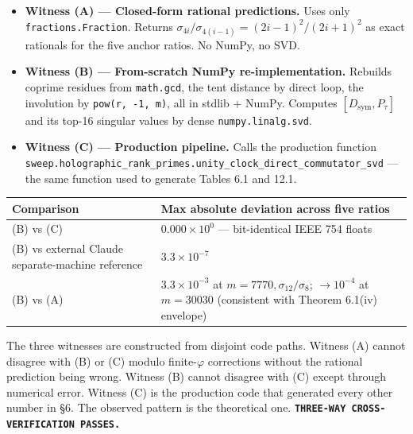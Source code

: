 \documentclass[
  11pt,
]{article}
\newcounter{none} %
\providecommand{\tightlist}{%
  \setlength{\itemsep}{0pt}\setlength{\parskip}{0pt}}
\begin{document}
\begin{itemize}
\tightlist
\item
  \textbf{Witness (A) --- Closed-form rational predictions.} Uses only
  \texttt{fractions.Fraction}. Returns
  \(\sigma_{4i}/\sigma_{4(i-1)} = (2i-1)^2/(2i+1)^2\) as exact rationals
  for the five anchor ratios. No NumPy, no SVD.
\item
  \textbf{Witness (B) --- From-scratch NumPy re-implementation.}
  Rebuilds coprime residues from \texttt{math.gcd}, the tent distance by
  direct loop, the involution by \texttt{pow(r,\ -1,\ m)}, all in stdlib
  + NumPy. Computes \([D_\text{sym}, P_\tau]\) and its top-16 singular
  values by dense \texttt{numpy.linalg.svd}.
\item
  \textbf{Witness (C) --- Production pipeline.} Calls the production
  function
  \texttt{sweep.\allowbreak{}holographic\_\allowbreak{}rank\_\allowbreak{}primes.\allowbreak{}unity\_\allowbreak{}clock\_\allowbreak{}direct\_\allowbreak{}commutator\_\allowbreak{}svd}
  --- the same function used to generate Tables 6.1 and 12.1.
\end{itemize}

{\def\LTcaptype{none} %
\begin{longtable}[]{@{}
  >{\raggedright\arraybackslash}p{}
  >{\raggedleft\arraybackslash}p{}@{}}
\toprule\noalign{}
\begin{minipage}[b]{\linewidth}\raggedright
Comparison
\end{minipage} & \begin{minipage}[b]{\linewidth}\raggedleft
Max absolute deviation across five ratios
\end{minipage} \\
\midrule\noalign{}
\endhead
\bottomrule\noalign{}
\endlastfoot
(B) vs (C) & \(0.000 \times 10^{0}\) --- bit-identical IEEE 754
floats \\
(B) vs external Claude separate-machine reference &
\(3.3 \times 10^{-7}\) \\
(B) vs (A) & \(3.3 \times 10^{-3}\) at
\(m = 7770, \sigma_{12}/\sigma_8\); \(\to 10^{-4}\) at \(m = 30030\)
(consistent with Theorem 6.1(iv) envelope) \\
\end{longtable}
}

The three witnesses are constructed from disjoint code paths. Witness
(A) cannot disagree with (B) or (C) modulo finite-\(\varphi\)
corrections without the rational prediction being wrong. Witness (B)
cannot disagree with (C) except through numerical error. Witness (C) is
the production code that generated every other number in §6. The
observed pattern is the theoretical one.
\textbf{\texttt{THREE-WAY\ CROSS-VERIFICATION\ PASSES.}}
\end{document}

